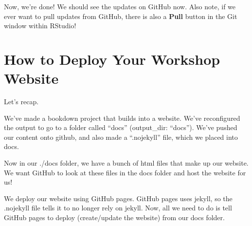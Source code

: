 \documentclass[
]{book}
\theoremstyle{definition}
\theoremstyle{definition}
\theoremstyle{definition}
\theoremstyle{definition}
\theoremstyle{remark}
\begin{document}
Now, we're done! We should see the updates on GitHub now. Also note, if we ever want to pull updates from GitHub, there is also a \textbf{Pull} button in the Git window within RStudio!

\chapter{How to Deploy Your Workshop Website}\label{how-to-deploy-your-workshop-website}

Let's recap.

We've made a bookdown project that builds into a website. We've reconfigured the output to go to a folder called ``docs'' (output\_dir: ``docs''). We've pushed our content onto github, and also made a ``.nojekyll'' file, which we placed into docs.

Now in our ./docs folder, we have a bunch of html files that make up our website. We want GitHub to look at these files in the docs folder and host the website for us!

We deploy our website using GitHub pages. GitHub pages uses jekyll, so the .nojekyll file tells it to no longer rely on jekyll. Now, all we need to do is tell GitHub pages to deploy (create/update the website) from our docs folder.
\end{document}
